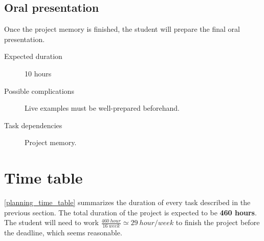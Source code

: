 \documentclass[a4paper,11pt,titlepage,abstract,numbers=noenddot,automark,mnsy,intlimits,rgb,dvipsnames]{report}
\begin{document}
\subsection{Oral presentation}
Once the project memory is finished, the student will prepare the final oral presentation.
\begin{description}
\item[Expected duration]
10 hours
\item[Possible complications]
Live examples must be well-prepared beforehand.
\item[Task dependencies]
Project memory.
\end{description}
\clearpage
\section{Time table}
\autoref{planning_time_table} summarizes the duration of every task described in the previous section.
The total duration of the project is expected to be \textbf{460 hours}. The student will need to work
$\frac{460 \: hour}{16 \: week} \simeq 29 \: hour/week$ to finish the project before the deadline, which seems reasonable.
\end{document}

